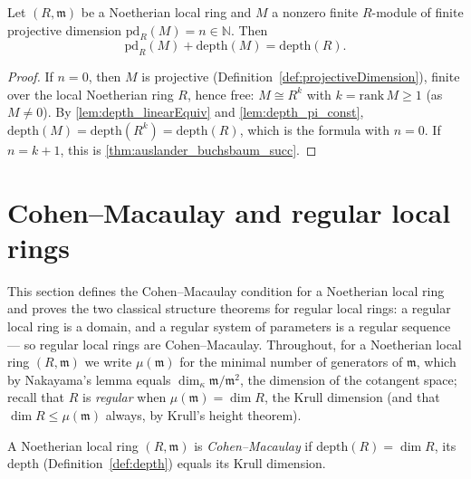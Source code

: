 \begin{theorem}
  \label{thm:auslander_buchsbaum}
  \leanok
  Let \((R, \mathfrak m)\) be a Noetherian local ring and \(M\) a nonzero finite
  \(R\)-module of finite projective dimension \(\mathrm{pd}_R(M) = n \in \mathbb{N}\).
  Then
  \[
    \mathrm{pd}_R(M) + \mathrm{depth}(M) = \mathrm{depth}(R).
  \]
\end{theorem}
\begin{proof}
  \leanok
  If \(n = 0\), then \(M\) is projective (Definition~\ref{def:projectiveDimension}),
  finite over the local Noetherian ring \(R\), hence free: \(M \cong R^{k}\) with
  \(k = \mathrm{rank}\, M \geq 1\) (as \(M \neq 0\)). By \ref{lem:depth_linearEquiv} and
  \ref{lem:depth_pi_const}, \(\mathrm{depth}(M) = \mathrm{depth}(R^k) =
  \mathrm{depth}(R)\), which is the formula with \(n = 0\). If \(n = k + 1\), this is
  \ref{thm:auslander_buchsbaum_succ}.
\end{proof}

\section{Cohen--Macaulay and regular local rings}
\label{sec:regular_cm}

This section defines the Cohen--Macaulay condition for a Noetherian local ring and
proves the two classical structure theorems for regular local rings: a regular local
ring is a domain, and a regular system of parameters is a regular sequence --- so
regular local rings are Cohen--Macaulay. Throughout, for a Noetherian local ring
\((R, \mathfrak m)\) we write \(\mu(\mathfrak m)\) for the minimal number of generators
of \(\mathfrak m\), which by Nakayama's lemma equals
\(\dim_\kappa \mathfrak m/\mathfrak m^2\), the dimension of the cotangent space; recall
that \(R\) is \emph{regular} when \(\mu(\mathfrak m) = \dim R\), the Krull dimension
(and that \(\dim R \leq \mu(\mathfrak m)\) always, by Krull's height theorem).

\begin{definition}
  \label{def:cohen_macaulay}
  \leanok
  A Noetherian local ring \((R, \mathfrak m)\) is \emph{Cohen--Macaulay} if
  \(\mathrm{depth}(R) = \dim R\), its depth (Definition~\ref{def:depth}) equals its
  Krull dimension.
\end{definition}

